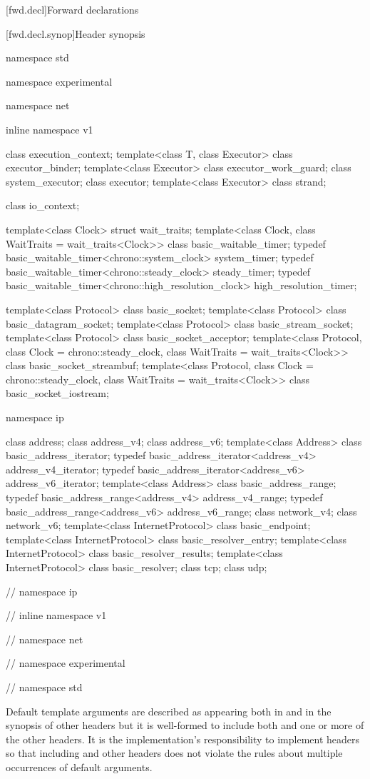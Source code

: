 
[fwd.decl]{Forward declarations}


[fwd.decl.synop]{Header  synopsis}

\begin{codeblock}
namespace std {
namespace experimental {
namespace net {
inline namespace v1 {

  class execution_context;
  template<class T, class Executor>
    class executor_binder;
  template<class Executor>
    class executor_work_guard;
  class system_executor;
  class executor;
  template<class Executor>
    class strand;

  class io_context;

  template<class Clock> struct wait_traits;
  template<class Clock, class WaitTraits = wait_traits<Clock>>
    class basic_waitable_timer;
  typedef basic_waitable_timer<chrono::system_clock> system_timer;
  typedef basic_waitable_timer<chrono::steady_clock> steady_timer;
  typedef basic_waitable_timer<chrono::high_resolution_clock> high_resolution_timer;

  template<class Protocol>
    class basic_socket;
  template<class Protocol>
    class basic_datagram_socket;
  template<class Protocol>
    class basic_stream_socket;
  template<class Protocol>
    class basic_socket_acceptor;
  template<class Protocol, class Clock = chrono::steady_clock,
    class WaitTraits = wait_traits<Clock>>
      class basic_socket_streambuf;
  template<class Protocol, class Clock = chrono::steady_clock,
    class WaitTraits = wait_traits<Clock>>
      class basic_socket_iostream;

  namespace ip {

    class address;
    class address_v4;
    class address_v6;
    template<class Address>
      class basic_address_iterator;
    typedef basic_address_iterator<address_v4> address_v4_iterator;
    typedef basic_address_iterator<address_v6> address_v6_iterator;
    template<class Address>
      class basic_address_range;
    typedef basic_address_range<address_v4> address_v4_range;
    typedef basic_address_range<address_v6> address_v6_range;
    class network_v4;
    class network_v6;
    template<class InternetProtocol>
      class basic_endpoint;
    template<class InternetProtocol>
      class basic_resolver_entry;
    template<class InternetProtocol>
      class basic_resolver_results;
    template<class InternetProtocol>
      class basic_resolver;
    class tcp;
    class udp;

  } // namespace ip
} // inline namespace v1
} // namespace net
} // namespace experimental
} // namespace std
\end{codeblock}

\pnum
Default template arguments are described as appearing both in 
and in the synopsis of other headers but it is well-formed to include both
 and one or more of the other headers.
\enternote It is the implementation's responsibility to implement headers so
that including  and other headers does not violate the rules
about multiple occurrences of default arguments. \exitnote



